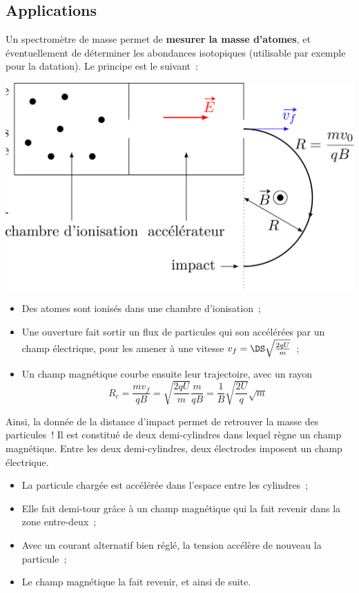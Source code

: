 \documentclass[../../main/main.tex]{subfiles}
\begin{document}
\subsection{Applications}
\begin{itemize}[label=$\diamond$]
	 Un spectromètre de masse permet de
	\textbf{mesurer la masse d'atomes}, et éventuellement de déterminer les
	abondances isotopiques (utilisable par exemple pour la datation). Le
	principe est le suivant~:
	\begin{center}
		\includegraphics[width=.5\linewidth]{spectrometre}
		\label{fig:spectrometre}
	\end{center}
	\begin{itemize}
		\item Des atomes sont ionisés dans une chambre d'ionisation~;
		\item Une ouverture fait sortir un flux de particules qui son
		      accélérées par un champ électrique, pour les amener à une
		      vitesse $v_f = \DS \sqrt{\frac{2qU}{m}}$~;
		\item Un champ magnétique courbe ensuite leur trajectoire, avec un
		      rayon
		      \[R_c = \frac{mv_f}{qB} = \sqrt{\frac{2qU}{m}}\frac{m}{qB} =
			      \frac{1}{B} \sqrt{\frac{2U}{q}}\sqrt{m}\]
	\end{itemize}
	Ainsi, la donnée de la distance d'impact permet de retrouver la masse
	des particules~!
	 Il est constitué de deux demi-cylindres dans lequel
	règne un champ magnétique. Entre les deux demi-cylindres, deux
	électrodes imposent un champ électrique.
	\begin{itemize}
		\item La particule chargée est accélérée dans l'espace entre les
		      cylindres~;
		\item Elle fait demi-tour grâce à un champ magnétique qui la fait
		      revenir dans la zone entre-deux~;
		\item Avec un courant alternatif bien réglé, la tension accélère de
		      nouveau la particule~;
		\item Le champ magnétique la fait revenir, et ainsi de suite.

\end{itemize}
\end{itemize}
\end{document}

